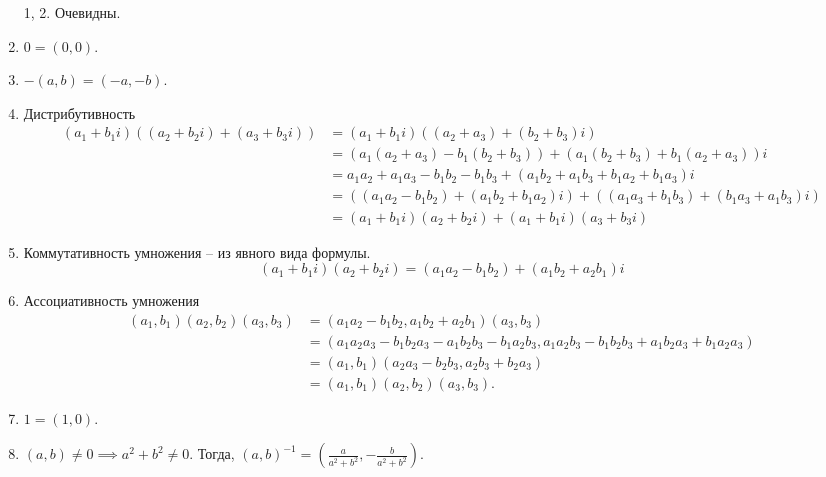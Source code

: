 \documentclass[a4paper]{article}
\begin{document}
\begin{colloq}
            \begin{enumerate}
            \item[1, 2.] Очевидны.
            \setcounter{enumi}{2}
            \item $0 = (0, 0)$.
            \item $-(a, b) = (-a, -b)$.
            \item Дистрибутивность
                \begin{align*}
                    (a_1 + b_1 i) ((a_2 + b_2 i) + (a_3 + b_3 i))
                    &= (a_1 + b_1 i) ((a_2 + a_3) + (b_2 + b_3) i) \\
                    &= (a_1 (a_2 + a_3) - b_1 (b_2 + b_3)) + (a_1 (b_2 + b_3) + b_1 (a_2 + a_3)) i \\
                    &= a_1 a_2 + a_1 a_3 - b_1 b_2 - b_1 b_3 + (a_1 b_2 + a_1 b_3 + b_1 a_2 + b_1 a_3) i \\
                    &= ((a_1 a_2 - b_1 b_2) + (a_1 b_2 + b_1 a_2)i) + ((a_1 a_3 + b_1 b_3) + (b_1 a_3 + a_1 b_3) i) \\
                    &= (a_1 + b_1 i)(a_2 + b_2 i) + (a_1 + b_1 i)(a_3 + b_3 i)
                \end{align*}
            \item Коммутативность умножения -- из явного вида формулы.
                \begin{equation*}
                    (a_1 + b_1 i) (a_2 + b_2 i) = (a_1 a_2 - b_1 b_2) + (a_1 b_2 + a_2 b_1) i
                \end{equation*}

            \item Ассоциативность умножения
                \begin{align*}
                    (a_1, b_1)(a_2, b_2)(a_3, b_3)
                    &= (a_1 a_2 - b_1 b_2, a_1 b_2 + a_2 b_1) (a_3, b_3) \\
                    &= (a_1 a_2 a_3 - b_1 b_2 a_3 - a_1 b_2 b_3 - b_1 a_2 b_3, a_1 a_2 b_3 - b_1 b_2 b_3 + a_1 b_2 a_3 + b_1 a_2 a_3) \\
                    &= (a_1, b_1)(a_2 a_3 - b_2 b_3, a_2 b_3 + b_2 a_3) \\
                    &= (a_1, b_1)(a_2, b_2)(a_3, b_3)
                .\end{align*}

            \item $1 = (1, 0)$.

            \item $(a, b) \neq 0 \implies a^2 + b^2 \neq 0$. Тогда, $(a, b)^{-1} = \left(\frac{a}{a^2 + b^2}, -\frac{b}{a^2 + b^2}\right)$.


\end{enumerate}
\end{colloq}
\end{document}
